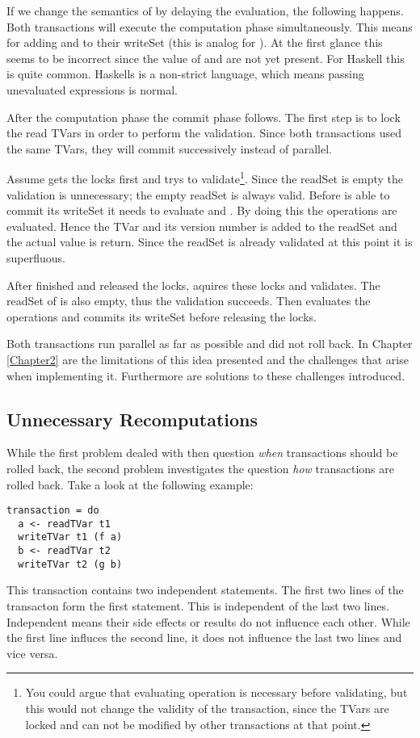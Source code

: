 If we change the semantics of  by delaying the evaluation, the following happens.
Both transactions will execute the computation phase simultaneously. This means for  adding
 and  to their writeSet (this is analog for ).
At the first glance this seems to be incorrect since the value of  and  are not yet present.
For Haskell this is quite common. Haskells is a non-strict language, which means passing unevaluated expressions
is normal. 

After the computation phase the commit phase follows. The first step is to lock the read TVars in order to 
perform the validation. Since both transactions used the same TVars, they will commit successively instead of
parallel. 

Assume  gets the locks first and trys to validate\footnote{You could argue that 
evaluating  operation is necessary before validating, but this would not change the validity of the 
transaction, since the TVars are locked and can not be modified by other transactions at that point.}. 
Since the readSet is empty the validation is unnecessary; the empty readSet is always valid. 
Before  is able to commit its writeSet it needs
to evaluate  and . By doing this the  operations are evaluated. Hence the 
TVar and its version number is added to the readSet and the actual value is return. Since the readSet is already 
validated at this point it is superfluous.

After  finished and released the locks,  aquires these locks
and validates. The readSet of  is also empty, thus the validation succeeds. Then  
evaluates the  operations and commits its writeSet before releasing the locks.

Both transactions run parallel as far as possible and did not roll back. In Chapter \ref{Chapter2}
are the limitations of this idea presented and the challenges that arise when implementing it.
Furthermore are solutions to these challenges introduced.


\subsection{Unnecessary Recomputations}
While the first problem dealed with then question \textit{when} transactions should be rolled back,
the second problem investigates the question \textit{how} transactions are rolled back. Take a look
at the following example:
\begin{lstlisting}
transaction = do 
  a <- readTVar t1	
  writeTVar t1 (f a)	
  b <- readTVar t2	
  writeTVar t2 (g b)	
\end{lstlisting}
This transaction contains two independent statements. The first two lines of the transacton form the first 
statement. This is independent of the last two lines. Independent means their side effects or results do not 
influence each other. While the first line influces the second line, it does not influence the last two lines
and vice versa. 

